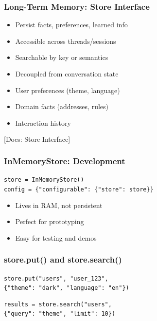 \documentclass[aspectratio=169,11pt]{beamer}
\newcommand{\docref}[1]{{\scriptsize\color{docgray}[Docs: #1]}}
\begin{document}
\begin{frame}
\frametitle{Long-Term Memory: Store Interface}
\begin{conceptbox}
\setlength{\itemsep}{1pt}
\begin{itemize}
\item Persist facts, preferences, learned info
\item Accessible across threads/sessions
\item Searchable by key or semantics
\item Decoupled from conversation state
\end{itemize}
\end{conceptbox}
\vspace{0.1cm}
\begin{tipbox}[Examples]
\setlength{\itemsep}{1pt}
\begin{itemize}
\item User preferences (theme, language)
\item Domain facts (addresses, rules)
\item Interaction history
\end{itemize}
\end{tipbox}
\docref{Store Interface}
\end{frame}

\begin{frame}
\frametitle{InMemoryStore: Development}
\begin{tipbox}
\texttt{store = InMemoryStore()}\\
\texttt{config = \{"configurable": \{"store": store\}\}}
\end{tipbox}
\vspace{0.1cm}
\begin{tipbox}[Characteristics]
\setlength{\itemsep}{1pt}
\begin{itemize}
\item Lives in RAM, not persistent
\item Perfect for prototyping
\item Easy for testing and demos
\end{itemize}
\end{tipbox}
\end{frame}

\begin{frame}
\frametitle{store.put() and store.search()}
\begin{tipbox}
\texttt{store.put("users", "user\_123",}\\
\texttt{\{"theme": "dark", "language": "en"\})}
\end{tipbox}
\vspace{0.1cm}
\begin{tipbox}
\texttt{results = store.search("users",}\\
\texttt{\{"query": "theme", "limit": 10\})}
\end{tipbox}
\end{frame}
\end{document}
